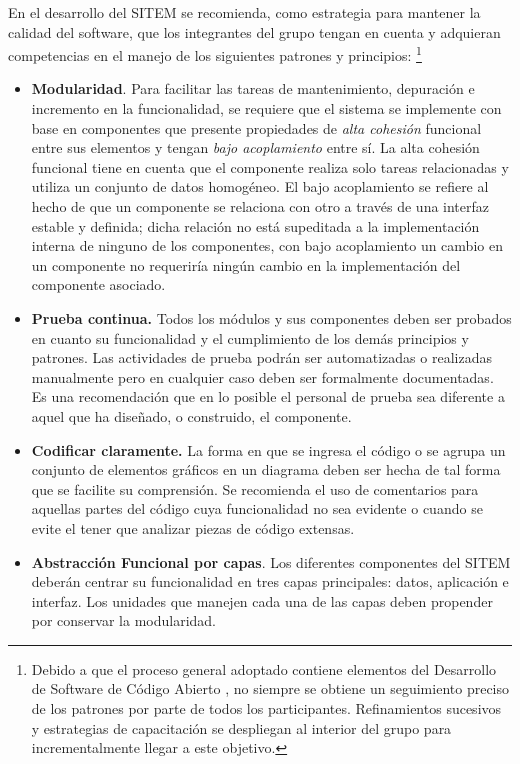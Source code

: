 En el desarrollo del SITEM se recomienda, como estrategia para mantener la calidad del software, que los integrantes del grupo tengan en cuenta y adquieran competencias en el manejo de los siguientes patrones y principios: \footnote{Debido a que el proceso general adoptado contiene elementos del Desarrollo de Software de Código Abierto \cite{koch}, no siempre se obtiene un seguimiento preciso de los patrones por parte de todos los participantes. Refinamientos sucesivos y estrategias de capacitación se despliegan al interior del grupo para incrementalmente llegar a este objetivo.}

\begin{itemize}
\item \textbf{Modularidad}. Para facilitar las tareas de mantenimiento, depuración e incremento en la funcionalidad, se requiere que el sistema se implemente con base en componentes que presente propiedades de \textit{alta cohesión} funcional entre sus elementos y tengan \textit{bajo acoplamiento} entre sí. La alta cohesión funcional tiene en cuenta que el componente realiza solo tareas relacionadas y utiliza un conjunto de datos homogéneo. El bajo acoplamiento se refiere al hecho de que un componente se relaciona con otro a través de una interfaz estable y definida; dicha relación no está supeditada a la implementación interna de ninguno de los componentes, con bajo acoplamiento un cambio en un componente no requeriría ningún cambio en la implementación del componente asociado.

\item \textbf{Prueba continua.} Todos los módulos y sus componentes deben ser probados en cuanto su funcionalidad y el cumplimiento de los demás principios y patrones. Las actividades de prueba podrán ser automatizadas o realizadas manualmente pero en cualquier caso deben ser formalmente documentadas. Es una recomendación que en lo posible el personal de prueba sea diferente a aquel que ha diseñado, o construido, el componente.

\item \textbf{Codificar claramente.} La forma en que se ingresa el código o se agrupa un conjunto de elementos gráficos en un diagrama deben ser hecha de tal forma que se facilite su comprensión. Se recomienda el uso de comentarios para aquellas partes del código cuya funcionalidad no sea evidente o cuando se evite el tener que analizar piezas de código extensas.
 
\item \textbf{Abstracción Funcional por capas}. Los diferentes componentes del SITEM deberán centrar su funcionalidad en tres capas principales: datos, aplicación e interfaz. Los unidades que manejen cada una de las capas deben propender por conservar la modularidad.


\end{itemize}
